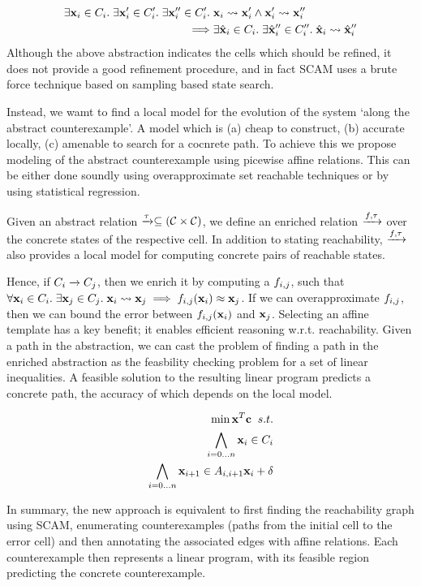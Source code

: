 \begin{align*}
    \exists \mathbf{x}_i \in C_i.\; \exists \mathbf{x}'_i \in C'_i.\; \exists \mathbf{x}''_i
    \in C'_i.\;  &\mathbf{x}_i \overset{}{\rightsquigarrow} \mathbf{x}'_i \wedge \mathbf{x}'_i \overset{}{\rightsquigarrow} \mathbf{x}''_i\\
    \implies &\exists \hat{\mathbf{x}}_i \in C_i.\; \exists \hat{\mathbf{x}}''_i
    \in C''_i.\; \hat{\mathbf{x}}_i \overset{}{\rightsquigarrow} \hat{\mathbf{x}}''_i
\end{align*}
Although the above abstraction indicates the cells which should be
refined, it does not provide a good refinement procedure, and in fact
SCAM uses a brute force technique based on sampling based state search.

Instead, we wamt to find a local model for the evolution of the system
`along the abstract counterexample'. A model which is (a) cheap to
construct, (b) accurate locally, (c) amenable to search for a cocnrete
path. To achieve this we propose modeling of the abstract
counterexample using picewise affine relations. This can be either
done soundly using overapproximate set reachable techniques or by
using statistical regression.

Given an abstract relation $\xrightarrow{\tau}\subseteq(\mathcal{C} \times \mathcal{C})$, we
define an enriched relation $\xrightarrow{f_{}, \tau}$ over the concrete
states of the respective cell. In addition to stating reachability,
$\xrightarrow{f_{}, \tau}$ also provides a local model for computing
concrete pairs of reachable states.

Hence, if $C_i \xrightarrow{} C_j$, then we enrich it by computing a
$f_{i,j}$, such that $\forall \mathbf{x}_i \in C_i.\; \exists \mathbf{x}_j \in
C_j.\; \mathbf{x}_i \overset{}{\rightsquigarrow} \mathbf{x}_j \implies f_{i,j}(\mathbf{x}_i) \approx \mathbf{x}_j$.
If we can overapproximate $f_{i,j}$, then we can bound the error
between $f_{i,j}(\mathbf{x}_i)$ and $\mathbf{x}_j$. Selecting an affine template
has a key benefit; it enables efficient reasoning w.r.t. reachability.
Given a path in the abstraction, we can cast the problem of finding a
path in the enriched abstraction as the feasbility checking problem
for a set of linear inequalities.  A feasible solution to the
resulting linear program predicts a concrete path, the accuracy of
which depends on the local model.

\begin{align}
\min \mathbf{x}^T \mathbf{c}\;\; s.t.\\
\bigwedge_{i=0\ldots n} \mathbf{x}_i \in C_i\\
\bigwedge_{i=0\ldots n} \mathbf{x}_{i+1} \in A_{i,i+1}\mathbf{x}_i + \delta
\end{align}

In summary, the new approach is equivalent to first finding the
reachability graph using SCAM, enumerating counterexamples (paths from
the initial cell to the error cell) and then annotating the associated
edges with affine relations. Each counterexample then represents a
linear program, with its feasible region predicting the concrete
counterexample.

